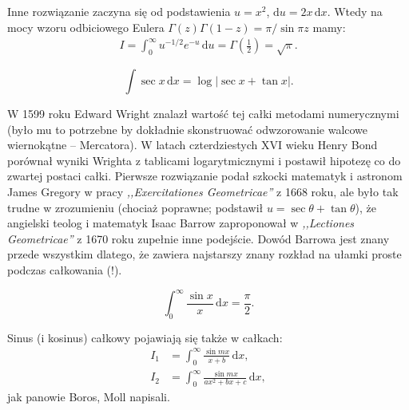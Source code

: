 Inne rozwiązanie zaczyna się od podstawienia $u = x^2$, $\mathrm{d} u = 2x \,\mathrm{d}x$.
Wtedy na mocy wzoru odbiciowego Eulera $\Gamma (z) \Gamma(1-z) = \pi/\sin \pi z$ mamy:
\begin{align}
	I = \int_0^\infty u^{-1/2} e^{-u}\,\mathrm{d}u = \Gamma \left(\frac 12\right) = \sqrt{\pi}.
\end{align}

\begin{problem}
    \begin{equation}
        \int \sec x \,\mathrm{d} x = \log| \sec x + \tan x|.
    \end{equation}
\end{problem}

W 1599 roku Edward Wright znalazł wartość tej całki metodami numerycznymi (było mu to potrzebne by dokładnie skonstruować odwzorowanie walcowe wiernokątne -- Mercatora).
%
%
W latach czterdziestych XVI wieku Henry Bond porównał wyniki Wrighta z tablicami logarytmicznymi i postawił hipotezę co do zwartej postaci całki.
%
Pierwsze rozwiązanie podał szkocki matematyk i astronom James Gregory w pracy \emph{,,Exercitationes Geometricae''} z 1668 roku, ale było tak trudne w zrozumieniu (chociaż poprawne; podstawił $u = \sec \theta + \tan \theta$), że angielski teolog i matematyk Isaac Barrow zaproponował w \emph{,,Lectiones Geometricae''} z 1670 roku zupełnie inne podejście.
%
%
Dowód Barrowa jest znany przede wszystkim dlatego, że zawiera najstarszy znany rozkład na ułamki proste podczas całkowania (!).
%

\begin{problem}
    \begin{equation}
        \int_0^\infty \frac {\sin x}{x} \,\mathrm{d} x = \frac \pi 2.
    \end{equation}
\end{problem}

Sinus (i kosinus) całkowy pojawiają się także w całkach:
\begin{align}
    I_1 & = \int_0^\infty \frac{\sin mx}{x + b} \,\mathrm{d}x, \\
    I_2 & = \int_0^\infty \frac{\sin mx}{ax^2 + bx + c} \,\mathrm{d}x,
\end{align}
jak panowie Boros, Moll \cite[s. 136]{boros04} napisali.

